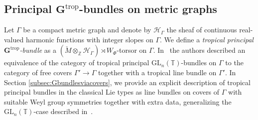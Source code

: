 \documentclass[10pt, a4paper]{amsart}
\theoremstyle{definition}
\theoremstyle{myitemstyle}
\newcommand{\Z}{\mathbb{Z}}
\newcommand{\TT}{\mathbb{T}}
\newcommand{\T}{\mathbb{T}}
\newcommand{\Mcheck}{{\check{M}}}
\newcommand{\calH}{\mathcal{H}}
\newcommand{\bfG}{\mathbf{G}}
\newcommand{\GL}{{\mathrm{GL}}}
\newcommand{\trop}{{\mathrm{trop}}}
\newcommand{\Ga}{\Gamma}
\begin{document}
\subsection*{Principal $\bfG^{\trop}$-bundles on metric graphs}  Let $\Gamma$ be a compact metric graph and denote by $\calH_\Gamma$ the sheaf of continuous real-valued harmonic functions with integer slopes on $\Gamma$. We define a \emph{tropical principal $\bfG^{\trop}$-bundle} as a $(\Mcheck \otimes_\Z {\calH_\Gamma})\rtimes W_\Phi$-torsor on $\Gamma$. In~\cite{2022GrossUlirschZakharov} the authors described an equivalence of the category of tropical principal $\GL_n(\T)$-bundles on $\Gamma$ to the category of free covers $\Ga'\to \Ga$ together with a tropical line bundle on $\Ga'$. In Section \ref{subsec:Gbundlesviacovers}, we provide an explicit description of tropical principal bundles in the classical Lie types as line bundles on covers of $\Gamma$ with suitable Weyl group symmetries together with extra data, generalizing the $\GL_n(\TT)$-case described in~\cite{2022GrossUlirschZakharov}.
\end{document}
